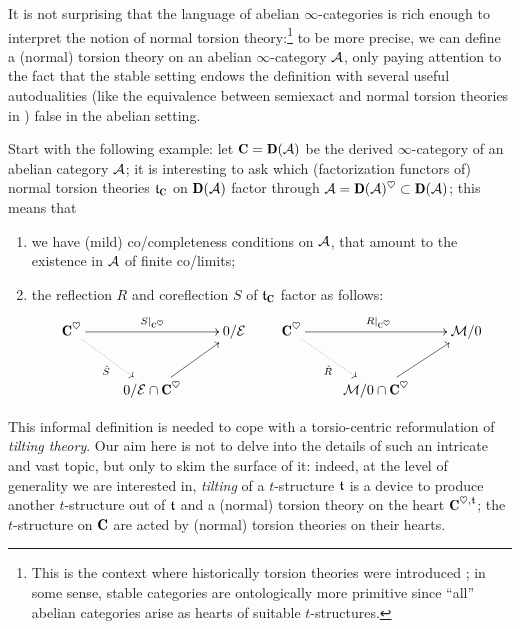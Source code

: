 \documentclass[a4paper,12pt]{amsart}
\begin{document}
It is not surprising that the language of abelian $\infty$\hyp{}categories is rich enough to interpret the notion of normal torsion theory:\footnote{This is the context where historically torsion theories were introduced \cite{dickson1966torsion}; in some sense, stable categories are ontologically more primitive since ``all'' abelian categories arise as hearts of suitable $t$\hyp{}structures.} to be more precise, we can define a (normal) torsion theory on an abelian $\infty$\hyp{}category $\mathcal{A}$, only paying attention to the fact that the stable setting endows the definition with several useful autodualities (like the equivalence between semiexact and normal torsion theories in \cite{Fiorenza2014}) false in the abelian setting.

Start with the following example: let $\C = \cate{D}(\A)$ be the derived $\infty$\hyp{}category of an abelian category $\mathcal{A}$; it is interesting to ask which (factorization functors of) normal torsion theories $\tee_\C$ on $\D(\A)$ factor through $\A = \D(\A)^\heart \subset \D(\A)$; this means that
\begin{enumerate}
\item we have (mild) co\fshyp{}completeness conditions on $\mathcal{A}$, that amount to the existence in $\mathcal{A}$ of finite co\fshyp{}limits;
\item the reflection $R$ and coreflection $S$ of $\tee_\C$ factor as follows:
\[
\xymatrix{
	\C^\heart \ar[rr]^{S|_{\C^\heart}}\ar@{.>}[dr]_{\hat S} && 0/ \E \\
	 & 0/\E \cap \C^\heart \ar[ur]
}\qquad
\xymatrix{
	\C^\heart \ar[rr]^{R|_{\C^\heart}}\ar@{.>}[dr]_{\hat R}  && \M/0 \\
	 & \M/0 \cap \C^\heart \ar[ur]
}
\]
\end{enumerate} 
This informal definition is needed to cope with a torsio\hyp{}centric reformulation of \emph{tilting theory}. Our aim here is not to delve into the details of such an intricate and vast topic, but only to skim the surface of it: indeed, 
at the level of generality we are interested in, \emph{tilting} of a $t$\hyp{}structure $\mathfrak{t}$ is a device to produce another $t$\hyp{}structure out of $\mathfrak{t}$ and a (normal) torsion theory on the heart $\C^{\heart, \tee}$; the $t$\hyp{}structure on $\C$ are acted by (normal) torsion theories on their hearts.
\end{document}
